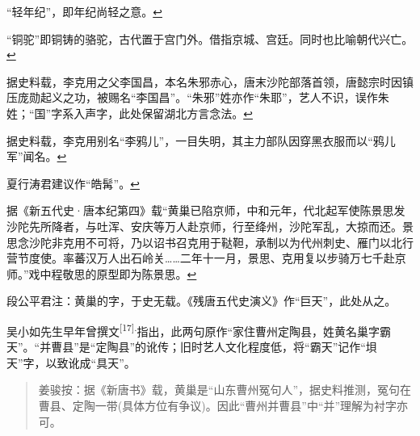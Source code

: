 \item
  \leavevmode\hypertarget{fn388}{}%
  ``轻年纪''，即年纪尚轻之意。\protect\hyperlink{fnref388}{↩}
\item
  \leavevmode\hypertarget{fn389}{}%
  ``铜驼''即铜铸的骆驼，古代置于宫门外。借指京城、宫廷。同时也比喻朝代兴亡。\protect\hyperlink{fnref389}{↩}
\item
  \leavevmode\hypertarget{fn390}{}%
  据史料载，李克用之父李国昌，本名朱邪赤心，唐末沙陀部落首领，唐懿宗时因镇压庞勋起义之功，被赐名``李国昌''。``朱邪''姓亦作``朱耶''，艺人不识，误作朱姓；``国''字系入声字，此处保留湖北方言念法。\protect\hyperlink{fnref390}{↩}
\item
  \leavevmode\hypertarget{fn391}{}%
  据史料载，李克用别名``李鸦儿''，一目失明，其主力部队因穿黑衣服而以``鸦儿军''闻名。\protect\hyperlink{fnref391}{↩}
\item
  \leavevmode\hypertarget{fn392}{}%
  夏行涛君建议作``皓髯''。\protect\hyperlink{fnref392}{↩}
\item
  \leavevmode\hypertarget{fn393}{}%
  据《新五代史·唐本纪第四》载``黄巢已陷京师，中和元年，代北起军使陈景思发沙陀先所降者，与吐浑、安庆等万人赴京师，行至绛州，沙陀军乱，大掠而还。景思念沙陀非克用不可将，乃以诏书召克用于鞑靼，承制以为代州刺史、雁门以北行营节度使。率蕃汉万人出石岭关\ldots{}\ldots{}二年十一月，景思、克用复以步骑万七千赴京师。''戏中程敬思的原型即为陈景思。\protect\hyperlink{fnref393}{↩}
\item
  \leavevmode\hypertarget{fn394}{}%
  段公平君注：黄巢的字，于史无载。《残唐五代史演义》作``巨天''，此处从之。

  吴小如先生早年曾撰文\textsuperscript{{[}17{]}.}指出，此两句原作``家住曹州定陶县，姓黄名巢字霸天''。``并曹县''是``定陶县''的讹传；旧时艺人文化程度低，将``霸天''记作``垻天''字，以致讹成``具天''。

  \begin{quote}
  姜骏按：据《新唐书》载，黄巢是``山东曹州冤句人''，据史料推测，冤句在曹县、定陶一带(具体方位有争议)。因此``曹州并曹县''中``并''理解为衬字亦可。
  \end{quote}

